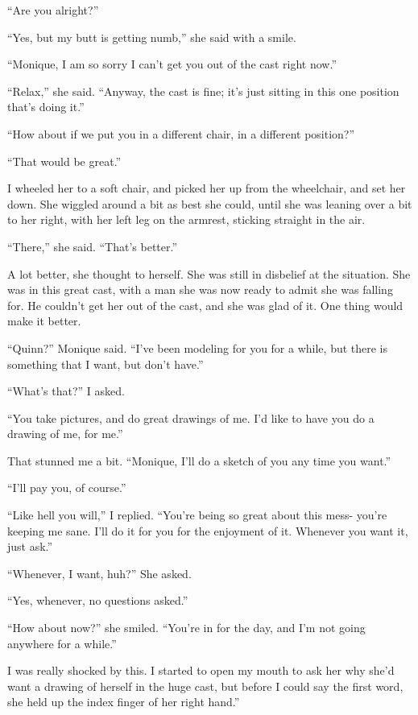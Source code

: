 ``Are you alright?''

``Yes, but my butt is getting numb,'' she said with a smile.

``Monique, I am so sorry I can't get you out of the cast right now.''

``Relax,'' she said. ``Anyway, the cast is fine; it's just sitting in this one position
that's doing it.''

``How about if we put you in a different chair, in a different position?''

``That would be great.''

I wheeled her to a soft chair, and picked her up from the wheelchair, and set her down. She
wiggled around a bit as best she could, until she was leaning over a bit to her right, with her
left leg on the armrest, sticking straight in the air.

``There,'' she said. ``That's better.''

\begin{thought}
A lot better, she thought to herself. She was still in disbelief at the situation. She was
in this great cast, with a man she was now ready to admit she was falling for. He couldn't get
her out of the cast, and she was glad of it. One thing would make it better.
\end{thought}

``Quinn?'' Monique said. ``I've been modeling for you for a while, but there is something
that I want, but don't have.''

``What's that?'' I asked.

``You take pictures, and do great drawings of me. I'd like to have you do a drawing of me,
for me.''

That stunned me a bit. ``Monique, I'll do a sketch of you any time you want.''

``I'll pay you, of course.''

``Like hell you will,'' I replied. ``You're being so great about this mess- you're keeping
me sane. I'll do it for you for the enjoyment of it. Whenever you want it, just ask.''

``Whenever, I want, huh?'' She asked.

``Yes, whenever, no questions asked.''

``How about now?'' she smiled. ``You're in for the day, and I'm not going anywhere for a
while.''

I was really shocked by this. I started to open my mouth to ask her why she'd want a
drawing of herself in the huge cast, but before I could say the first word, she held up the
index finger of her right hand.''

